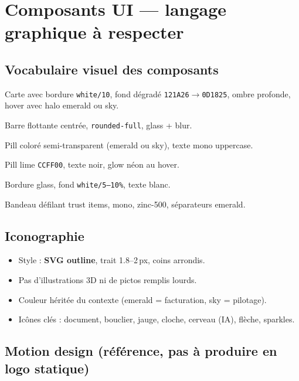\documentclass[11pt,a4paper]{report}
\newcommand{\hex}[1]{\texttt{\small #1}}
\begin{document}
\chapter{Composants UI — langage graphique à respecter}

\section{Vocabulaire visuel des composants}

\begin{description}[leftmargin=3.5cm, style=nextline]
    \item[GlassCard] Carte avec bordure \texttt{white/10}, fond dégradé \hex{121A26}$\rightarrow$\hex{0D1825},
    ombre profonde, hover avec halo emerald ou sky.
    \item[Nav pill] Barre flottante centrée, \texttt{rounded-full}, glass + blur.
    \item[Badge] Pill coloré semi-transparent (emerald ou sky), texte mono uppercase.
    \item[CTA primaire] Pill lime \hex{CCFF00}, texte noir, glow néon au hover.
    \item[CTA secondaire] Bordure glass, fond \texttt{white/5--10\%}, texte blanc.
    \item[Marquee] Bandeau défilant trust items, mono, zinc-500, séparateurs emerald.
\end{description}

\section{Iconographie}

\begin{itemize}[leftmargin=*]
    \item Style : \textbf{SVG outline}, trait 1.8--2\,px, coins arrondis.
    \item Pas d'illustrations 3D ni de pictos remplis lourds.
    \item Couleur héritée du contexte (emerald = facturation, sky = pilotage).
    \item Icônes clés : document, bouclier, jauge, cloche, cerveau (IA), flèche, sparkles.
\end{itemize}

\section{Motion design (référence, pas à produire en logo statique)}
\end{document}
